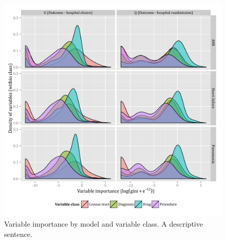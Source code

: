 \documentclass[]{article}\usepackage[]{graphicx}\usepackage[]{color}
\begin{document}
% 


\begin{figure}[H]
    \includegraphics{../figures/variable_importance_by_model_and_class.png}
    \caption[Error rate for random forest model of hospital choice.]
      {Variable importance by model and variable class. A descriptive sentence.}
    \label{fig:variable_importance_by_model_and_class}
\end{figure}
\end{document}

